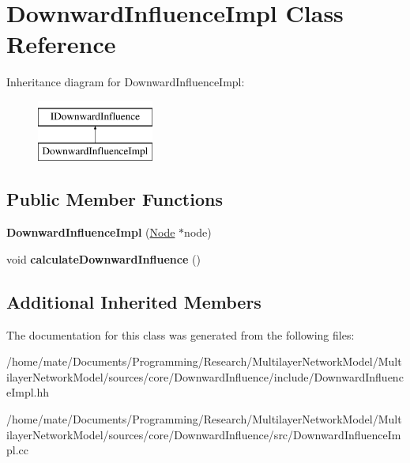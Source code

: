 \hypertarget{classDownwardInfluenceImpl}{}\section{Downward\+Influence\+Impl Class Reference}
\label{classDownwardInfluenceImpl}
Inheritance diagram for Downward\+Influence\+Impl\+:\begin{figure}[H]
\begin{center}
\leavevmode
\includegraphics[height=2.000000cm]{classDownwardInfluenceImpl}
\end{center}
\end{figure}
\subsection*{Public Member Functions}
\begin{DoxyCompactItemize}
\item 
{\bfseries Downward\+Influence\+Impl} (\hyperlink{classNode}{Node} $\ast$node)\hypertarget{classDownwardInfluenceImpl_add04549a8e99e67304c133b4d9a46fc9}{}\label{classDownwardInfluenceImpl_add04549a8e99e67304c133b4d9a46fc9}

\item 
void {\bfseries calculate\+Downward\+Influence} ()\hypertarget{classDownwardInfluenceImpl_a05fdd6c5ef32911d503d9262e9431812}{}\label{classDownwardInfluenceImpl_a05fdd6c5ef32911d503d9262e9431812}

\end{DoxyCompactItemize}
\subsection*{Additional Inherited Members}


The documentation for this class was generated from the following files\+:\begin{DoxyCompactItemize}
\item 
/home/mate/\+Documents/\+Programming/\+Research/\+Multilayer\+Network\+Model/\+Multilayer\+Network\+Model/sources/core/\+Downward\+Influence/include/Downward\+Influence\+Impl.\+hh\item 
/home/mate/\+Documents/\+Programming/\+Research/\+Multilayer\+Network\+Model/\+Multilayer\+Network\+Model/sources/core/\+Downward\+Influence/src/Downward\+Influence\+Impl.\+cc\end{DoxyCompactItemize}
